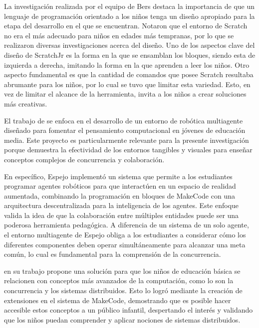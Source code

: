 La investigación realizada por el equipo de Bers destaca la importancia de que un lenguaje de programación orientado a los niños tenga un diseño apropiado para la etapa del desarrollo en el que se encuentran. Notaron que el entorno de Scratch no era el más adecuado para niños en edades más tempranas, por lo que se realizaron diversas investigaciones acerca del diseño. Uno de los aspectos clave del diseño de ScratchJr es la forma en la que se ensamblan los bloques, siendo esta de izquierda a derecha, imitando la forma en la que aprenden a leer los niños. Otro aspecto fundamental es que la cantidad de comandos que posee Scratch resultaba abrumante para los niños, por lo cual se tuvo que limitar esta variedad. Esto, en vez de limitar el alcance de la herramienta, invita a los niños a crear soluciones más creativas.


El trabajo de  se enfoca en el desarrollo de un entorno de robótica multiagente diseñado para fomentar el pensamiento computacional en jóvenes de educación media. Este proyecto es particularmente relevante para la presente investigación porque demuestra la efectividad de los entornos tangibles y visuales para enseñar conceptos complejos de concurrencia y colaboración.

En específico, Espejo implementó un sistema que permite a los estudiantes programar agentes robóticos para que interactúen en un espacio de realidad aumentada, combinando la programación en bloques de MakeCode con una arquitectura descentralizada para la inteligencia de los agentes. Este enfoque valida la idea de que la colaboración entre múltiples entidades puede ser una poderosa herramienta pedagógica. A diferencia de un sistema de un solo agente, el entorno multiagente de Espejo obliga a los estudiantes a considerar cómo los diferentes componentes deben operar simultáneamente para alcanzar una meta común, lo cual es fundamental para la comprensión de la concurrencia.


 en su trabajo propone una solución para que los niños de educación básica se relacionen con conceptos más avanzados de la computación, como lo son la concurrencia y los sistemas distribuidos. Esto lo logró mediante la creación de extensiones en el sistema de MakeCode, demostrando que es posible hacer accesible estos conceptos a un público infantil, despertando el interés y validando que los niños puedan comprender y aplicar nociones de sistemas distribuidos.

